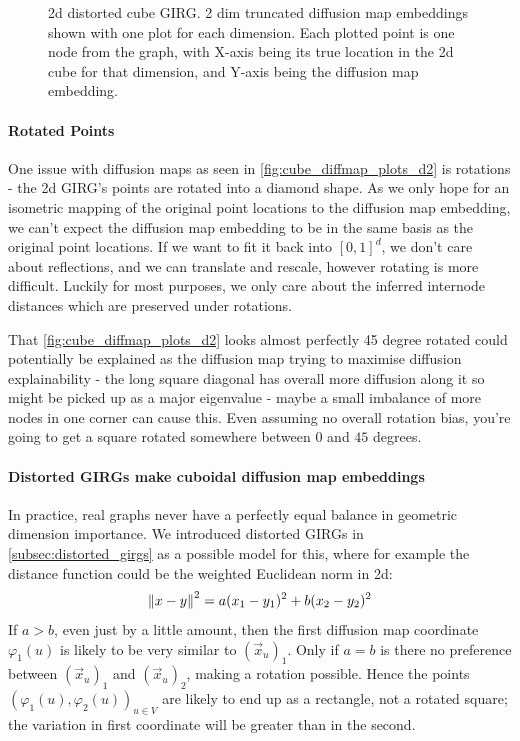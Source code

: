 \begin{figure}
  \caption{2d distorted cube GIRG. 2 dim truncated diffusion map embeddings shown with one plot for each dimension. Each plotted point is one node from the graph, with X-axis being its true location in the 2d cube for that dimension, and Y-axis being the diffusion map embedding.}
  \label{fig:2d_distorted_major_minor}
\end{figure}


\paragraph{Rotated Points} One issue with diffusion maps as seen in \cref{fig:cube_diffmap_plots_d2} is rotations - the 2d GIRG's points are rotated into a diamond shape. As we only hope for an isometric mapping of the original point locations to the diffusion map embedding, we can't expect the diffusion map embedding to be in the same basis as the original point locations. If we want to fit it back into $[0, 1]^d$, we don't care about reflections, and we can translate and rescale, however rotating is more difficult. Luckily for most purposes, we only care about the inferred internode distances which are preserved under rotations.

That \cref{fig:cube_diffmap_plots_d2} looks almost perfectly 45 degree rotated could potentially be explained as the diffusion map trying to maximise diffusion explainability - the long square diagonal has overall more diffusion along it so might be picked up as a major eigenvalue - maybe a small imbalance of more nodes in one corner can cause this. Even assuming no overall rotation bias, you're going to get a square rotated somewhere between $0$ and $45$ degrees.

\paragraph{Distorted GIRGs make cuboidal diffusion map embeddings} In practice, real graphs never have a perfectly equal balance in geometric dimension importance. 
We introduced distorted GIRGs in \cref{subsec:distorted_girgs} as a possible model for this, where for example the distance function could be the weighted Euclidean norm in 2d:
\begin{equation}\left\lVert x - y\right\rVert^2 = a (x_1 - y_1)^2 + b(x_2 - y_2)^2
\end{equation}
If $a > b$, even just by a little amount, then the first diffusion map coordinate $\varphi_1(u)$ is likely to be very similar to $(\vec{x}_u)_1$. Only if $a=b$ is there no preference between $(\vec{x}_u)_1$ and $(\vec{x}_u)_2$, making a rotation possible.
Hence the points $(\varphi_1(u), \varphi_2(u))_{u \in V}$ are likely to end up as a rectangle, not a rotated square; the variation in first coordinate will be greater than in the second.


